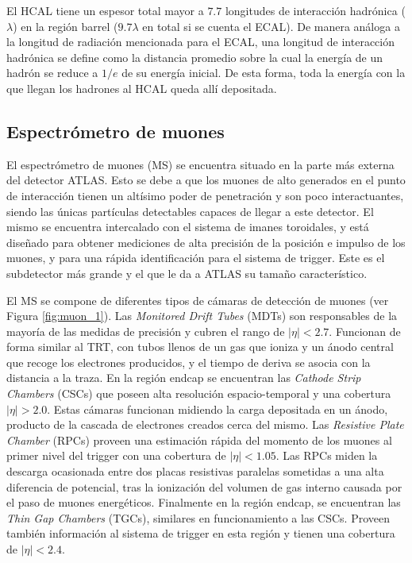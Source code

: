 El HCAL tiene un espesor total mayor a $7.7$ longitudes de interacción
hadrónica ($\lambda$) en la región barrel ($9.7\lambda$ en total si se cuenta el ECAL). De manera
análoga a la longitud de radiación mencionada para el ECAL, una longitud de
interacción hadrónica se define como la distancia promedio sobre la cual la energía
de un hadrón se reduce a $1/e$ de su energía inicial. De esta forma, toda la energía
con la que llegan los hadrones al HCAL queda allí depositada.

\subsection{Espectrómetro de muones}

El espectrómetro de muones (MS) se encuentra situado en la parte más externa del detector ATLAS. Esto se debe a que los muones de alto \pt generados en el punto de interacción tienen un altísimo poder de penetración y son poco interactuantes, siendo las únicas partículas detectables capaces de llegar a este detector. El mismo se encuentra intercalado con el sistema de imanes toroidales, y está diseñado para obtener mediciones de alta precisión de la posición e impulso de los muones, y para una rápida identificación para el sistema de trigger. Este es el subdetector más grande y el que le da a ATLAS su tamaño característico. 

El MS se compone de diferentes tipos de cámaras de detección de muones (ver Figura \ref{fig:muon_1}). Las \textit{Monitored Drift Tubes} (MDTs) son responsables de la mayoría de las medidas de precisión y cubren el rango de $|\eta|<2.7$. Funcionan de forma similar al TRT, con tubos llenos de un gas que ioniza y un ánodo central que recoge los electrones producidos, y el tiempo de deriva se asocia con la distancia a la traza. En la región endcap se encuentran las \textit{Cathode Strip Chambers} (CSCs) que poseen alta resolución espacio-temporal y una cobertura $|\eta|>2.0$. Estas cámaras funcionan midiendo la carga depositada en un ánodo, producto de la cascada de electrones creados cerca del mismo. Las \textit{Resistive Plate Chamber} (RPCs) proveen una estimación rápida del momento de los muones al primer nivel del trigger con una cobertura de $|\eta|<1.05$. Las RPCs miden la descarga ocasionada entre dos placas resistivas paralelas sometidas a una alta diferencia de potencial, tras la ionización del volumen de gas interno causada por el paso de muones energéticos. Finalmente en la región endcap, se encuentran las \textit{Thin Gap Chambers} (TGCs), similares en funcionamiento a las CSCs. Proveen también información al sistema de trigger en esta región y tienen una cobertura de $|\eta|<2.4$.


